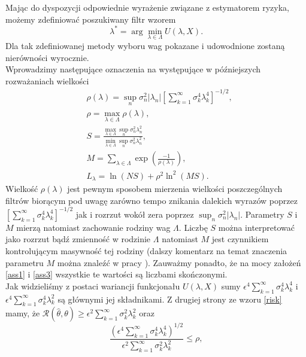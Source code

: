 \documentclass[man,mfiu]{mgrwms}
\begin{document}
Mając do dyspozycji odpowiednie wyrażenie związane z estymatorem ryzyka, możemy zdefiniować poszukiwany filtr wzorem
\begin{equation}\label{estimator}
\lambda^*=\arg\min_{\lambda\in \Lambda}U(\lambda,X).
\end{equation}
Dla tak zdefiniowanej metody wyboru wag pokazane i udowodnione zostaną nierówności wyrocznie.\\
\indent Wprowadzimy następujące oznaczenia na występujące w późniejszych rozważaniach wielkości
\begin{displaymath}
\begin{split}
&\rho(\lambda)=\sup_n\sigma_n^2|\lambda_n|\left[\sum_{k=1}^{\infty}\sigma_k^4\lambda_k^4\right]^{-1/2},\\
&\rho=\max_{\lambda\in \Lambda}\rho(\lambda),\\
&S=\frac{\max_{\lambda\in\Lambda}\sup_n\sigma_n^2\lambda_n^2}{\min_{\lambda\in \Lambda}\sup_n\sigma_n^2\lambda_n^2},\\
&M=\sum_{\lambda\in \Lambda}\exp\left(\frac{-1}{\rho(\lambda)}\right),\\
&L_{\lambda}=\ln(NS)+\rho^2\ln^2(MS).
\end{split}
\end{displaymath}
Wielkość $\rho(\lambda)$ jest pewnym sposobem mierzenia wielkości poszczególnych filtrów biorącym pod uwagę zarówno tempo znikania dalekich wyrazów poprzez $\left[\sum_{k=1}^{\infty}\sigma_k^4\lambda_k^4\right]^{-1/2}$ jak i rozrzut wokół zera poprzez $\sup_n\sigma_n^2|\lambda_n|$. Parametry $S$ i $M$ mierzą natomiast zachowanie rodziny wag $\Lambda$. Liczbę $S$ można interpretować jako rozrzut bądź zmienność w rodzinie $\Lambda$ natomiast $M$ jest czynnikiem kontrolującym masywność tej rodziny (dalszy komentarz na temat znaczenia parametru $M$ można znaleźć w pracy \cite{birge}). Zauważmy ponadto, że na mocy założeń \ref{ass1} i \ref{ass3} wszystkie te wartości są liczbami skończonymi.\\
\indent Jak widzieliśmy z postaci wariancji funkcjonału $U(\lambda, X)$ sumy $\epsilon^4\sum_{k=1}^{\infty}\sigma_k^4\lambda_k^4$ i $\epsilon^4\sum_{k=1}^{\infty}\sigma_k^4\lambda_k^2$ są głównymi jej składnikami. Z drugiej strony ze wzoru \ref{risk} mamy, że $\mathcal{R}(\hat{\theta},\theta)\geq \epsilon^2\sum_{k=1}^{\infty}\sigma_k^2\lambda_k^2$ oraz 
\begin{equation}\label{rho}
\frac{\left(\epsilon^4\sum_{k=1}^{\infty}\sigma_k^4\lambda_k^4\right)^{1/2}}{\epsilon^2\sum_{k=1}^{\infty}\sigma_k^2\lambda_k^2}\leq \rho,
\end{equation}
\end{document}
